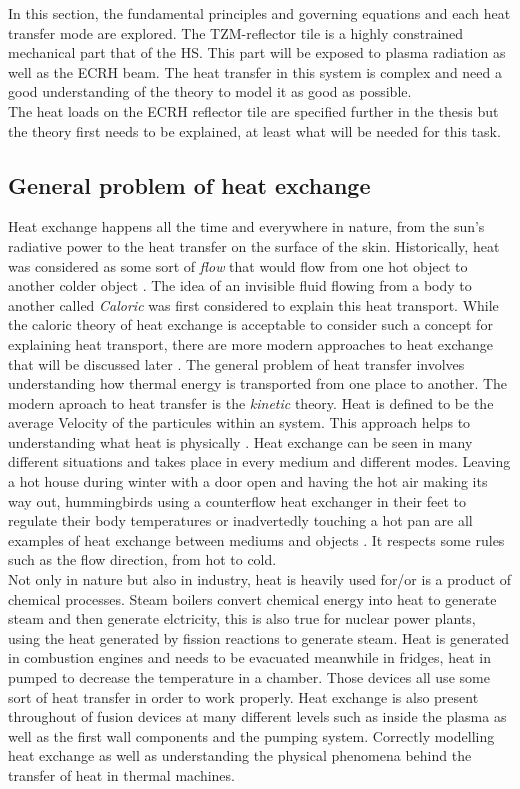 \normalsize{In this section, the fundamental principles and governing equations and each heat transfer mode are explored. The TZM-reflector tile is a highly constrained mechanical part that of the \acrshort{HS}. This part will be exposed to plasma radiation as well as the \acrshort{ECRH} beam. The heat transfer in this system is complex and need a good understanding of the theory to model it as good as possible.}
\\
\normalsize{\indent The heat loads on the \acrshort{ECRH} reflector tile are specified further in the thesis but the theory first needs to be explained, at least what will be needed for this task.}
\subsection{General problem of heat exchange}
\normalsize{Heat exchange happens all the time and everywhere in nature, from the sun's radiative power to the heat transfer on the surface of the skin. Historically, heat was considered as some sort of {\it flow} that would flow from one hot object to another colder object \cites{ahtt6e}. The idea of an invisible fluid flowing from a body to another called {\it Caloric} was first considered to explain this heat transport. While the caloric theory of heat exchange is acceptable to consider such a concept for explaining heat transport, there are more modern approaches to heat exchange that will be discussed later \cites{ahtt6e}. The general problem of heat transfer involves understanding how thermal energy is transported from one place to another. The modern aproach to heat transfer is the {\it kinetic} theory. Heat is defined to be the average Velocity of the particules within an system. This approach helps to understanding what heat is physically \cites{cengel2004heat}. Heat exchange can be seen in many different situations and takes place in every medium and different modes. Leaving a hot house during winter with a door open and having the hot air making its way out, hummingbirds using a counterflow heat exchanger in their feet to regulate their body temperatures \cites{UDVARDY_1983} or inadvertedly touching a hot pan are all examples of heat exchange between mediums and objects \cites{ahtt6e}. It respects some rules such as the flow direction, from hot to cold.}
\\
\break
\normalsize{\indent Not only in nature but also in industry, heat is heavily used for/or is a product of chemical processes. Steam boilers convert chemical energy into heat to generate steam and then generate elctricity, this is also true for nuclear power plants, using the heat generated by fission reactions to generate steam. Heat is generated in combustion engines and needs to be evacuated meanwhile in fridges, heat in pumped to decrease the temperature in a chamber. Those devices all use some sort of heat transfer in order to work properly. Heat exchange is also present throughout of fusion devices at many different levels such as inside the plasma as well as the first wall components and the pumping system. Correctly modelling heat exchange as well as understanding the physical phenomena behind the transfer of heat in thermal machines.}
